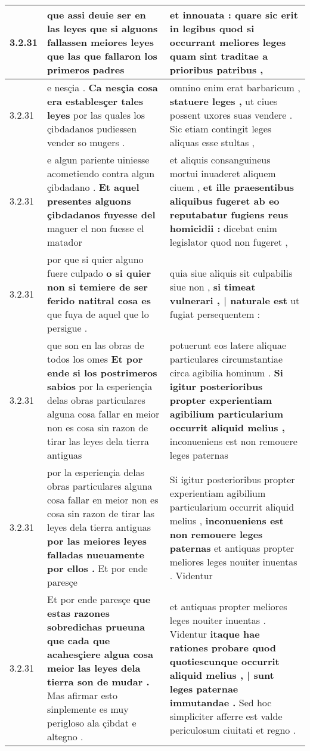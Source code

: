 \begin{tabular}{|p{1cm}|p{6.5cm}|p{6.5cm}|}
3.2.31 & que assi deuie ser en las leyes \textbf{ que si alguons fallassen meiores leyes } que las que fallaron los primeros padres & et innouata : \textbf{ quare sic erit in legibus quod si occurrant meliores leges } quam sint traditae a prioribus patribus , \\\hline
3.2.31 & e nesçia . \textbf{ Ca nesçia cosa era establesçer tales leyes } por las quales los çibdadanos pudiessen vender so mugers . & omnino enim erat barbaricum , \textbf{ statuere leges , } ut ciues possent uxores suas vendere . Sic etiam contingit leges aliquas esse stultas , \\\hline
3.2.31 & e algun pariente uiniesse acometiendo contra algun çibdadano . \textbf{ Et aquel presentes alguons çibdadanos fuyesse del } maguer el non fuesse el matador & et aliquis consanguineus mortui inuaderet aliquem ciuem , \textbf{ et ille praesentibus aliquibus fugeret ab eo reputabatur fugiens reus homicidii : } dicebat enim legislator quod non fugeret , \\\hline
3.2.31 & por que si quier alguno fuere culpado \textbf{ o si quier non si temiere de ser ferido natitral cosa es } que fuya de aquel que lo persigue . & quia siue aliquis sit culpabilis siue non , \textbf{ si timeat vulnerari , | naturale est } ut fugiat persequentem : \\\hline
3.2.31 & que son en las obras de todos los omes \textbf{ Et por ende si los postrimeros sabios } por la esperiençia delas obras particulares alguna cosa fallar en meior non es cosa sin razon de tirar las leyes dela tierra antiguas & potuerunt eos latere aliquae particulares circumstantiae circa agibilia hominum . \textbf{ Si igitur posterioribus propter experientiam agibilium particularium occurrit aliquid melius , } inconueniens est non remouere leges paternas \\\hline
3.2.31 & por la esperiençia delas obras particulares alguna cosa fallar en meior non es cosa sin razon de tirar las leyes dela tierra antiguas \textbf{ por las meiores leyes falladas nueuamente por ellos . } Et por ende paresçe & Si igitur posterioribus propter experientiam agibilium particularium occurrit aliquid melius , \textbf{ inconueniens est non remouere leges paternas } et antiquas propter meliores leges nouiter inuentas . Videntur \\\hline
3.2.31 & Et por ende paresçe \textbf{ que estas razones sobredichas prueuna que cada que acahesçiere algua cosa meior las leyes dela tierra son de mudar . } Mas afirmar esto sinplemente es muy perigloso ala çibdat e altegno . & et antiquas propter meliores leges nouiter inuentas . Videntur \textbf{ itaque hae rationes probare quod quotiescunque occurrit aliquid melius , | sunt leges paternae immutandae . } Sed hoc simpliciter afferre est valde periculosum ciuitati et regno . \\\hline

\end{tabular}
